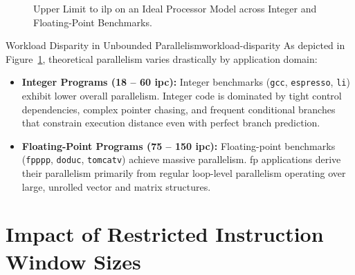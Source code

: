 \begin{figure}[htpb]
\caption{Upper Limit to \gls{ilp} on an Ideal Processor Model across Integer and Floating-Point Benchmarks.}
\label{fig:ilp_ideal_machine}
\end{figure}

\begin{observation}{Workload Disparity in Unbounded Parallelism}{workload-disparity}
As depicted in Figure~\ref{fig:ilp_ideal_machine}, theoretical parallelism varies drastically by application domain:
\begin{itemize}
    \item \textbf{Integer Programs (18 -- 60 \gls{ipc}):} Integer benchmarks (\texttt{gcc}, \texttt{espresso}, \texttt{li}) exhibit lower overall parallelism. Integer code is dominated by tight control dependencies, complex pointer chasing, and frequent conditional branches that constrain execution distance even with perfect branch prediction.
    \item \textbf{Floating-Point Programs (75 -- 150 \gls{ipc}):} Floating-point benchmarks (\texttt{fpppp}, \texttt{doduc}, \texttt{tomcatv}) achieve massive parallelism. \gls{fp} applications derive their parallelism primarily from regular loop-level parallelism operating over large, unrolled vector and matrix structures.
\end{itemize}
\end{observation}

\section{Impact of Restricted Instruction Window Sizes}
\label{sec:window_impact}

